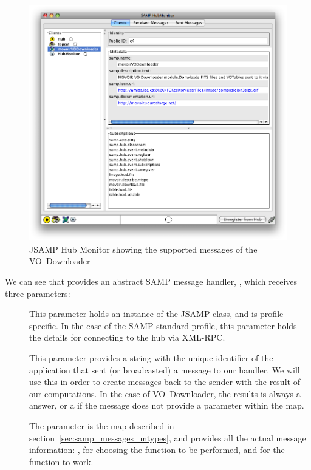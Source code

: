 			\begin{figure}[tbp]
				\centering
					\includegraphics[height=0.4\textheight]
					{fig/Hub_topcat_vodownloader.png}
				\caption[VO Downloader in the JSAMP Hub Monitor]
				{JSAMP Hub Monitor showing the
				supported messages of the VO~Downloader}
				\label{fig:fig_Hub_topcat_vodownloader}
			\end{figure}
			
			 We can see that \initSamp{} provides an
			abstract SAMP message handler,
			, which receives three
			parameters:
			
			\begin{description}
				\item[] This
				parameter holds an instance of the JSAMP
				 class, and is profile
				specific. In the case of the SAMP standard profile,
				this parameter holds the details for connecting to
				the hub via XML-RPC.
				
				 \item[] This parameter
				provides a string with the unique identifier of the
				application that sent (or broadcasted) a message to
				our handler. We will use this in order to create
				messages back to the sender with the result of our
				computations. In the case of VO~Downloader, the
				results is always a \sampok{} answer, or a
				\samperror{} if the message does not provide a
				 parameter within the \sampparams{}
				map.
				
				 \item[] The 
				parameter is the map described in
				section~\ref{sec:samp_messages_mtypes}, and
				provides all the actual message information:
				\sampmtype{}, for choosing the function to be
				performed, and \sampparams{} for the function to
				work.
			\end{description}
			
